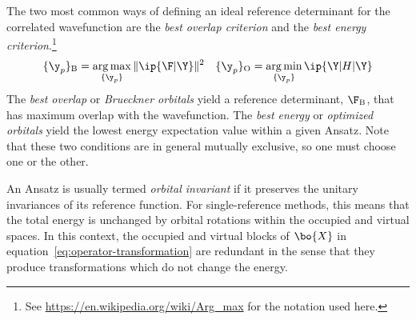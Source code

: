 \begin{rmk}
The two most common ways of defining an ideal reference determinant for the correlated wavefunction are the \textit{best overlap criterion} and the \textit{best energy criterion}.\footnote{See \url{https://en.wikipedia.org/wiki/Arg_max} for the notation used here.}
\begin{align}
\label{eq:brueckner-and-oo-general-condition}
  \{\y_p\}_{\text{B}}
=
  \underset{\{\y_p\}}{\arg\max}\,
  \|\ip{\F|\Y}\|^2
&&
  \{\y_p\}_{\text{O}}
=
  \underset{\{\y_p\}}{\arg\min}\,
  \ip{\Y|H|\Y}
\end{align}
The \textit{best overlap} or \textit{Brueckner orbitals} yield a reference determinant, $\F_{\text{B}}$, that has maximum overlap with the wavefunction.
The \textit{best energy} or \textit{optimized orbitals} yield the lowest energy expectation value within a given Ansatz.
Note that these two conditions are in general mutually exclusive, so one must choose one or the other.
\end{rmk}

\begin{dfn}
An Ansatz is usually termed \textit{orbital invariant} if it preserves the unitary invariances of its reference function.
For single-reference methods, this means that the total energy is unchanged by orbital rotations within the occupied and virtual spaces.
In this context, the occupied and virtual blocks of $\bo{X}$ in equation~\ref{eq:operator-transformation} are redundant in the sense that they produce transformations which do not change the energy.
\end{dfn}

